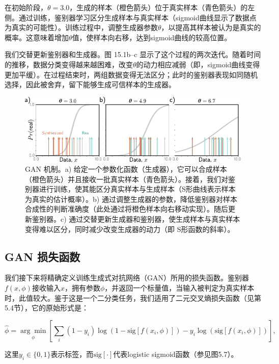 \documentclass[lang=cn,newtx,10pt,scheme=chinese]{elegantbook}
\begin{document}
在初始阶段，\(\theta = 3.0\)，生成的样本（橙色箭头）位于真实样本（青色箭头）的左侧。通过训练，鉴别器学习区分生成样本与真实样本（sigmoid曲线显示了数据点为真实的可能性）。训练过程中，调整生成器参数\(\theta\)，以提高其样本被认为是真实的概率。这意味着增加\(\theta\)值，使样本向右移，达到sigmoid曲线的较高位置。

我们交替更新鉴别器和生成器。图 15.1b–c 显示了这个过程的两次迭代。随着时间的推移，数据分类变得越来越困难，改变\(\theta\)的动力相应减弱（即，sigmoid曲线变得更加平缓）。在过程结束时，两组数据变得无法区分；此时的鉴别器表现如同随机选择，因此被舍弃，留下能够生成可信样本的生成器。

\begin{figure}[ht!]
\centering
\includegraphics[width=0.7\linewidth]{PDFFigures/UDLChap15PDF/GanGaussMotivation.pdf}
\caption{GAN 机制。a) 给定一个参数化函数（生成器），它可以合成样本（橙色箭头）并且接收一批真实样本（青色箭头）。接着，我们对鉴别器进行训练，使其能区分真实样本与生成样本（S形曲线表示样本为真实的估计概率）。b) 通过调整生成器的参数，降低鉴别器对样本合成性的判断准确度（此处通过将橙色样本向右移动实现）。随后更新鉴别器。c) 通过交替更新生成器和鉴别器，使生成样本与真实样本变得难以区分，同时减少改变生成器的动力（即 S形函数的斜率）。}
\end{figure}



\subsection{GAN 损失函数}
我们接下来将精确定义训练生成式对抗网络（GAN）所用的损失函数。鉴别器\(f(x, \phi)\)接收输入\(x\)，拥有参数\(\phi\)，并返回一个标量值，当输入被判定为真实样本时，此值较大。鉴于这是一个二分类任务，我们适用了二元交叉熵损失函数（见第5.4节），它的原始形式是：

\begin{equation}
\hat{\phi} = \underset{\phi}{\arg\min} \left[ \sum_i (1 - y_i) \log \left( 1 - \text{sig}[f(x_i, \phi)] \right) - y_i \log \left( \text{sig}[f(x_i, \phi)] \right) \right], 
\end{equation}

这里\(y_i \in \{0, 1\}\)表示标签，而\(\text{sig}[\cdot]\)代表logistic sigmoid函数（参见图5.7）。
\end{document}
